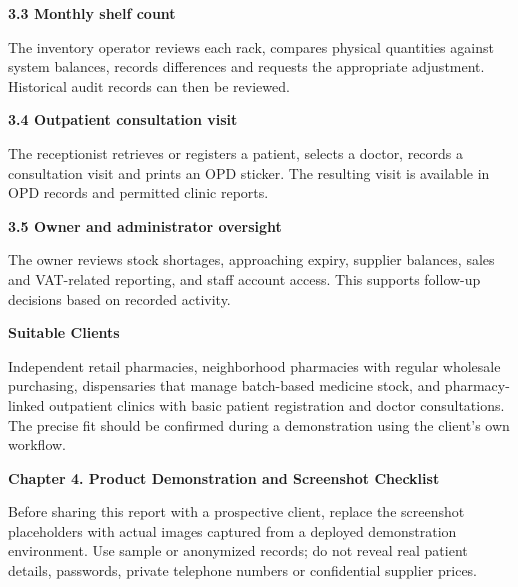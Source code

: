 \documentclass[11pt,a4paper]{article}
\newcommand{\chaptertitle}[1]{%
    \vspace*{0.2cm}%
    {\normalfont\LARGE\bfseries\color{HeaderNavy} #1}%
    \vspace*{0.3cm}\par%
}
\newcommand{\subheading}[1]{%
    \vspace*{0.2cm}%
    {\normalfont\large\bfseries\color{SubHeader} #1}%
    \vspace*{0.15cm}\par%
}
\begin{document}
\subheading{3.3 Monthly shelf count}
The inventory operator reviews each rack, compares physical quantities against system balances, records differences and requests the appropriate adjustment. Historical audit records can then be reviewed.

\subheading{3.4 Outpatient consultation visit}
The receptionist retrieves or registers a patient, selects a doctor, records a consultation visit and prints an OPD sticker. The resulting visit is available in OPD records and permitted clinic reports.

\subheading{3.5 Owner and administrator oversight}
The owner reviews stock shortages, approaching expiry, supplier balances, sales and VAT-related reporting, and staff account access. This supports follow-up decisions based on recorded activity.

\subheading{Suitable Clients}
Independent retail pharmacies, neighborhood pharmacies with regular wholesale purchasing, dispensaries that manage batch-based medicine stock, and pharmacy-linked outpatient clinics with basic patient registration and doctor consultations. The precise fit should be confirmed during a demonstration using the client's own workflow.

\newpage
\chaptertitle{Chapter 4. Product Demonstration and Screenshot Checklist}

Before sharing this report with a prospective client, replace the screenshot placeholders with actual images captured from a deployed demonstration environment. Use sample or anonymized records; do not reveal real patient details, passwords, private telephone numbers or confidential supplier prices.

\vspace{0.4cm}
\end{document}
